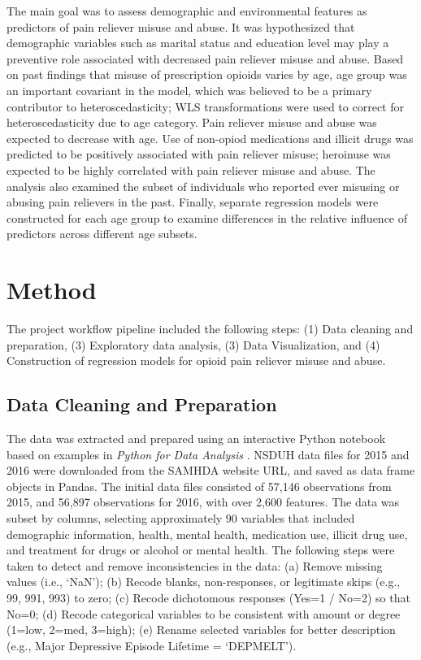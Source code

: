 \documentclass[sigconf]{acmart}
\begin{document}
The main goal was to assess demographic and environmental features as 
predictors of pain reliever misuse and abuse. It was hypothesized that 
demographic variables such as marital status and education level may play a 
preventive role associated with decreased pain reliever misuse and abuse. 
Based on past findings that misuse of prescription opioids varies by age, 
age group was an important covariant in the model, which was believed to be a
primary contributor to heteroscedasticity; WLS transformations were used to 
correct for heteroscedasticity due to age category. Pain reliever misuse and 
abuse was expected to decrease with age. Use of non-opiod medications and illicit 
drugs was predicted to be positively associated with pain reliever misuse; 
heroinuse was expected to be highly correlated with pain reliever misuse and abuse. 
The analysis also examined the subset of individuals who reported ever misusing 
or abusing pain relievers in the past. Finally, separate regression models were 
constructed for each age group to examine differences in the relative influence 
of predictors across different age subsets. 

\section{Method}

The project workflow pipeline included the following steps: (1) Data cleaning and 
preparation, (3) Exploratory data analysis, (3) Data Visualization, and (4) 
Construction of regression models for opioid pain reliever misuse and abuse. 

\subsection{Data Cleaning and Preparation }

The data was extracted
and prepared using an interactive Python notebook based on examples in 
\emph{Python for Data Analysis} \cite{mckinney17}. NSDUH data files for 2015 
and 2016 were downloaded from the SAMHDA website \cite{samhsa16} URL, and 
saved as data frame objects in Pandas. The initial data files consisted of 
57,146 observations from 2015, and 56,897 observations for 2016, with over 
2,600 features. The data was subset by columns, selecting approximately 90 
variables that included demographic information, health, mental health, 
medication use, illicit drug use, and treatment for drugs or alcohol or 
mental health. The following steps were taken to detect and remove 
inconsistencies in the data: (a) Remove missing values (i.e., `NaN'); (b) 
Recode blanks, non-responses, or legitimate skips (e.g., 99, 991, 993) to 
zero; (c) Recode dichotomous responses (Yes=1 / No=2) so that No=0; (d) 
Recode categorical variables to be consistent with amount or degree 
(1=low, 2=med, 3=high); (e) Rename selected variables for better 
description (e.g., Major Depressive Episode Lifetime = `DEPMELT').
\end{document}
